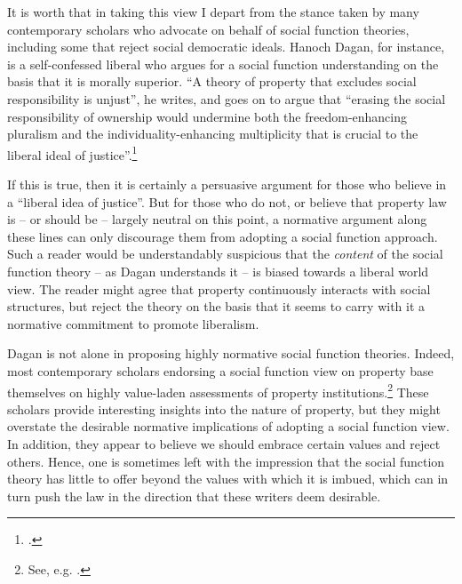 It is worth  that in taking this view I depart from the stance taken by many contemporary scholars who advocate on behalf of social function theories, including some that reject social democratic ideals. Hanoch Dagan, for instance, is a self-confessed liberal who argues for a social function understanding on the basis that it is morally superior. ``A theory of property that excludes social responsibility is unjust'', he writes, and goes on to argue that ``erasing the social responsibility of ownership would undermine both the freedom-enhancing pluralism and the individuality-enhancing multiplicity that is crucial to the liberal ideal of justice''.\footcite[1259]{dagan07}

If this is true, then it is certainly a persuasive argument for those who believe in a ``liberal idea of justice''. But for those who do not, or believe that property law is -- or should be -- largely neutral on this point, a normative argument along these lines can only discourage them from adopting a social function approach. Such a reader would be understandably suspicious that the {\it content} of the social function theory -- as Dagan understands it -- is biased towards a liberal world view. The reader might agree that property continuously interacts with social structures, but reject the theory on the basis that it seems to carry with it a normative commitment to promote liberalism.

Dagan is not alone in proposing highly normative social function theories. Indeed, most contemporary scholars endorsing a social function view on property base themselves on highly value-laden assessments of property institutions.\footnote{See, e.g. \cite{alexander09,crawford11,davidson11,singer09,penalver09}.} These scholars provide interesting insights into the nature of property, but they might overstate the desirable normative implications of adopting a social function view. In addition, they appear to believe we should embrace certain values and reject others. Hence, one is sometimes left with the impression that the social function theory has little to offer beyond the values with which it is imbued, which can in turn push the law in the direction that these writers deem desirable. 

